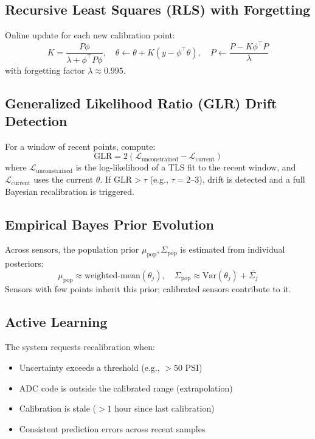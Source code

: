 \documentclass[11pt]{article}
\begin{document}
\subsection{Recursive Least Squares (RLS) with Forgetting}

Online update for each new calibration point:
\[
K = \frac{P \phi}{\lambda + \phi^\top P \phi}, \quad
\theta \leftarrow \theta + K (y - \phi^\top \theta), \quad
P \leftarrow \frac{P - K \phi^\top P}{\lambda}
\]
with forgetting factor $\lambda \approx 0.995$.

\subsection{Generalized Likelihood Ratio (GLR) Drift Detection}

For a window of recent points, compute:
\[
\text{GLR} = 2 \left( \mathcal{L}_{\text{unconstrained}} - \mathcal{L}_{\text{current}} \right)
\]
where $\mathcal{L}_{\text{unconstrained}}$ is the log-likelihood of a TLS fit to the recent window, and $\mathcal{L}_{\text{current}}$ uses the current $\theta$. If $\text{GLR} > \tau$ (e.g., $\tau = 2$--$3$), drift is detected and a full Bayesian recalibration is triggered.

\subsection{Empirical Bayes Prior Evolution}

Across sensors, the population prior $\mu_{\text{pop}}, \Sigma_{\text{pop}}$ is estimated from individual posteriors:
\[
\mu_{\text{pop}} \approx \text{weighted-mean}(\theta_j), \quad
\Sigma_{\text{pop}} \approx \text{Var}(\theta_j) + \overline{\Sigma_j}
\]
Sensors with few points inherit this prior; calibrated sensors contribute to it.

\subsection{Active Learning}

The system requests recalibration when:
\begin{itemize}
\item Uncertainty exceeds a threshold (e.g., $> 50$ PSI)
\item ADC code is outside the calibrated range (extrapolation)
\item Calibration is stale ($> 1$ hour since last calibration)
\item Consistent prediction errors across recent samples
\end{itemize}
\end{document}
